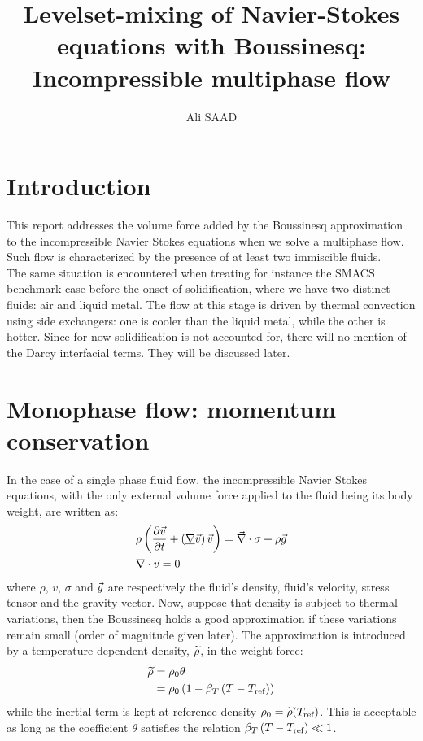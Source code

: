 \documentclass[11pt,a4paper]{article}
\title{Levelset-mixing of Navier-Stokes equations with Boussinesq:\\ Incompressible multiphase flow }
\author{Ali SAAD}
\begin{document}
\maketitle
\section{Introduction}
This report addresses the volume force added by the Boussinesq approximation to the incompressible Navier Stokes equations
when we solve a multiphase flow. Such flow is characterized by the presence of at least two immiscible fluids. \\
The same situation is encountered when treating for instance the SMACS benchmark case before the onset of solidification, where we have two distinct fluids: air and liquid metal.
The flow at this stage is driven by thermal convection using side exchangers: one is cooler than the liquid metal, while the other is hotter.
Since for now solidification is not accounted for, there will no mention of the Darcy interfacial terms. They will be discussed later.
\section{Monophase flow: momentum conservation}
In the case of a single phase fluid flow, the incompressible Navier Stokes equations, with the only external volume 
force applied to the fluid being its body weight, are written as:
\begin{align}
\label{eq:NS_monophase}
& \rho \left( \frac{\partial \vec{v}}{\partial t} + \left( \underline{\nabla} \vec{v} \right) \vec{v}  \right) = \vec{\nabla} \cdot \sigma + \rho \vec{g} \\ 
& \nabla \cdot \vec{v} = 0
\end{align}
where $\rho$, $v$, $\sigma$ and $\vec{g}$ are respectively the fluid's density, fluid's velocity, stress tensor and the gravity vector.
Now, suppose that density is subject to thermal variations, then the Boussinesq holds a good approximation if these variations remain small (order of magnitude given later).
The approximation is introduced by a temperature-dependent density, $\widetilde{\rho}$, in the weight force:
\begin{align}
\label{eq:boussinesq}
\widetilde{\rho} &= \rho_0 \theta \\ 
          &= \rho_0 \left( 1-\beta_T \left( T-T_{\text{ref}} \right) \right)
\end{align}
while the inertial term is kept at reference density $\rho_0 = \widetilde{\rho}(T_{\text{ref}})$. This is acceptable as long as the coefficient $\theta$
satisfies the relation $\beta_T \left( T-T_{\text{ref}} \right) \ll 1$.
\end{document}
